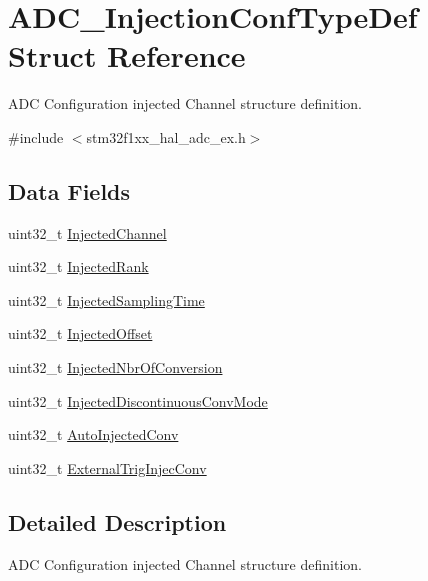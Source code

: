 \hypertarget{struct_a_d_c___injection_conf_type_def}{}\section{A\+D\+C\+\_\+\+Injection\+Conf\+Type\+Def Struct Reference}
\label{struct_a_d_c___injection_conf_type_def}


A\+DC Configuration injected Channel structure definition.  




{\ttfamily \#include $<$stm32f1xx\+\_\+hal\+\_\+adc\+\_\+ex.\+h$>$}

\subsection*{Data Fields}
\begin{DoxyCompactItemize}
\item 
uint32\+\_\+t \hyperlink{struct_a_d_c___injection_conf_type_def_aa74eb880cdada1796f96a2ada0ed64dd}{Injected\+Channel}
\item 
uint32\+\_\+t \hyperlink{struct_a_d_c___injection_conf_type_def_a5cd2664770d0917ae4d70ccc703b54b3}{Injected\+Rank}
\item 
uint32\+\_\+t \hyperlink{struct_a_d_c___injection_conf_type_def_a1c082ab5a5715594d9387eacbebd99a0}{Injected\+Sampling\+Time}
\item 
uint32\+\_\+t \hyperlink{struct_a_d_c___injection_conf_type_def_a23b15894f9d014c9187f4ab6f3eaa8fe}{Injected\+Offset}
\item 
uint32\+\_\+t \hyperlink{struct_a_d_c___injection_conf_type_def_a6988026b36336bb3099410ce45688585}{Injected\+Nbr\+Of\+Conversion}
\item 
uint32\+\_\+t \hyperlink{struct_a_d_c___injection_conf_type_def_a1b7de280b507291a00ab297ced1d0eca}{Injected\+Discontinuous\+Conv\+Mode}
\item 
uint32\+\_\+t \hyperlink{struct_a_d_c___injection_conf_type_def_ad8d4635c3c52f7763b8d7dfb2d0d4605}{Auto\+Injected\+Conv}
\item 
uint32\+\_\+t \hyperlink{struct_a_d_c___injection_conf_type_def_a4e7ca27dcc31a41f231b3780ce1cb824}{External\+Trig\+Injec\+Conv}
\end{DoxyCompactItemize}


\subsection{Detailed Description}
A\+DC Configuration injected Channel structure definition. 

